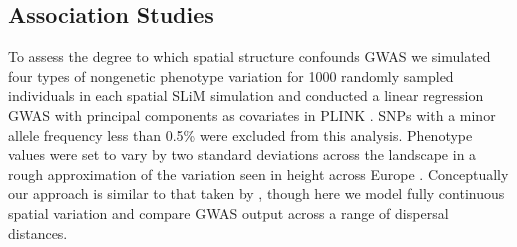 \documentclass[10pt,twoside,lineno,hidelinks]{preprint}
\begin{document}

\subsection{Association Studies}

To assess the degree to which spatial structure confounds GWAS we simulated four types of nongenetic phenotype variation for 1000 randomly sampled individuals in each spatial SLiM simulation and conducted a linear regression GWAS with principal components as covariates in PLINK \citep{PURCELL2007}. SNPs with a minor allele frequency less than 0.5\% were excluded from this analysis. Phenotype values were set to vary by two standard deviations across the landscape in a rough approximation of the variation seen in height across Europe \citep{Turchin2012,garcia2006,garcia2007}. Conceptually our approach is similar to that taken by \citet{Mathieson2012}, though here we model fully continuous spatial variation and compare GWAS output across a range of dispersal distances. 
\end{document}
